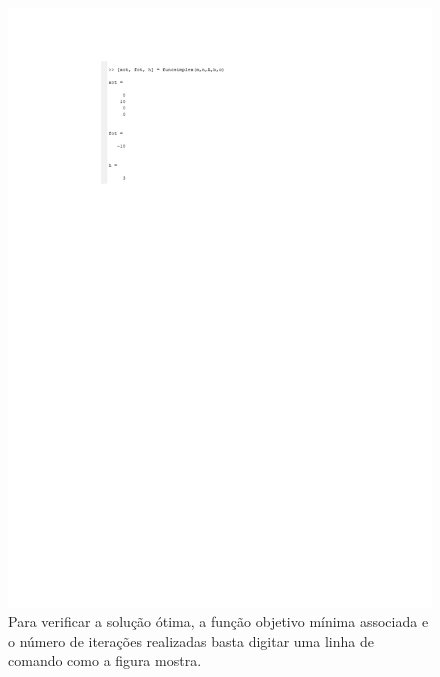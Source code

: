 \documentclass[10pt]{article}
\begin{document}
\begin{figure}[H]
    \centering
    \includegraphics[scale = 0.65]{fig8teste.pdf}
    \caption{Para verificar a solução ótima, a função objetivo mínima associada e o número de iterações realizadas basta digitar uma linha de comando como a figura mostra.}
\end{figure}
\end{document}
